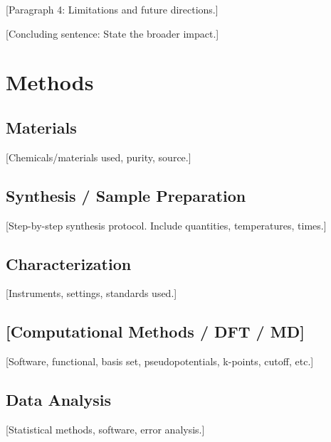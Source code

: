 \documentclass[9pt,twoside,lineno]{article}
\begin{document}
[Paragraph 4: Limitations and future directions.]

[Concluding sentence: State the broader impact.]

\section*{Methods}

\subsection*{Materials}
[Chemicals/materials used, purity, source.]

\subsection*{Synthesis / Sample Preparation}
[Step-by-step synthesis protocol. Include quantities, temperatures, times.]

\subsection*{Characterization}
[Instruments, settings, standards used.]

\subsection*{[Computational Methods / DFT / MD]}
[Software, functional, basis set, pseudopotentials, k-points, cutoff, etc.]

\subsection*{Data Analysis}
[Statistical methods, software, error analysis.]


\end{document}
